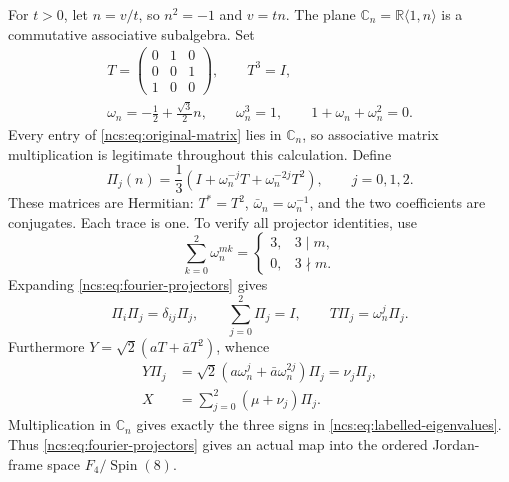 \documentclass[11pt]{article}
\theoremstyle{definition}
\begin{document}
For $t>0$, let $n=v/t$, so $n^2=-1$ and $v=tn$.
The plane $\mathbb C_n=\mathbb R\langle1,n\rangle$ is a
commutative associative subalgebra. Set
\begin{equation}
 \begin{gathered}
 T=\begin{pmatrix}0&1&0\\0&0&1\\1&0&0\end{pmatrix},
 \qquad T^3=I,\\
 \omega_n=-\frac12+\frac{\sqrt3}{2}n,\qquad
 \omega_n^3=1,\qquad1+\omega_n+\omega_n^2=0.
 \end{gathered}
 \label{ncs:eq:cyclic-matrix}\tag{NCS10}
\end{equation}
Every entry of \eqref{ncs:eq:original-matrix} lies in
$\mathbb C_n$, so associative matrix multiplication is legitimate
throughout this calculation. Define
\begin{equation}
 \Pi_j(n)=\frac13\left(I+\omega_n^{-j}T
                               +\omega_n^{-2j}T^2\right),
 \qquad j=0,1,2.
 \label{ncs:eq:fourier-projectors}\tag{NCS11}
\end{equation}
These matrices are Hermitian: $T^*=T^2$,
$\bar\omega_n=\omega_n^{-1}$, and the two coefficients are
conjugates. Each trace is one. To verify all projector identities,
use
\[
 \sum_{k=0}^2\omega_n^{mk}=
 \begin{cases}3,&3\mid m,\\0,&3\nmid m.\end{cases}
\]
Expanding \eqref{ncs:eq:fourier-projectors} gives
\begin{equation}
 \Pi_i\Pi_j=\delta_{ij}\Pi_j,\qquad
 \sum_{j=0}^2\Pi_j=I,\qquad T\Pi_j=\omega_n^j\Pi_j.
 \label{ncs:eq:projector-identities}\tag{NCS12}
\end{equation}
Furthermore $Y=\sqrt2(aT+\bar aT^2)$, whence
\begin{equation}
 \begin{aligned}
 Y\Pi_j&=\sqrt2(a\omega_n^j+\bar a\omega_n^{2j})\Pi_j
            =\nu_j\Pi_j,\\
 X&=\sum_{j=0}^2(\mu+\nu_j)\Pi_j.
 \end{aligned}
 \label{ncs:eq:spectral-decomposition}\tag{NCS13}
\end{equation}
Multiplication in $\mathbb C_n$ gives exactly the three signs in
\eqref{ncs:eq:labelled-eigenvalues}. Thus
\eqref{ncs:eq:fourier-projectors} gives an actual map into the
ordered Jordan-frame space $F_4/\operatorname{Spin}(8)$.
\end{document}
